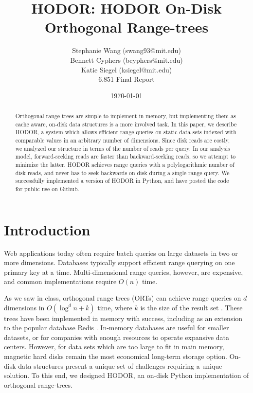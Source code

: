 \documentclass[11pt, oneside]{article}
\title{HODOR: HODOR On-Disk Orthogonal Range-trees}
\author{Stephanie Wang (swang93@mit.edu)\\
Bennett Cyphers (bcyphers@mit.edu)\\
Katie Siegel (ksiegel@mit.edu)\\[2ex]
6.851 Final Report}
\date{\today}
\begin{document}
\maketitle

\vfill

\begin{abstract}

    Orthogonal range trees are simple to implement in memory, but implementing
    them as cache aware, on-disk data structures is a more involved task. In this
    paper, we describe HODOR, a system which allows efficient range queries on
    static data sets indexed with comparable values in an arbitrary number of
    dimensions. Since disk reads are costly, we analyzed our structure in terms
    of the number of reads per query. In our analysis model, forward-seeking
    reads are faster than backward-seeking reads, so we attempt to minimize the
    latter. HODOR achieves range queries with a polylogarithmic number of disk
    reads, and never has to seek backwards on disk during a single range query.
    We successfully implemented a version of HODOR in Python, and have posted
    the code for public use on Github.

\end{abstract}

\clearpage

\section{Introduction}

Web applications today often require batch queries on large datasets in two or
more dimensions. Databases typically support efficient range querying on one
primary key at a time. Multi-dimensional range queries, however, are expensive,
and common implementations require $O(n)$ time. 

As we saw in class, orthogonal range trees (ORTs) can achieve range queries on $d$
dimensions in $O(\log^{d} n + k)$ time, where $k$ is the size of the result set
\cite{lecture}. These trees have been implemented in memory with success,
including as an extension to the popular database Redis \cite{redis}. In-memory
databases are useful for smaller datasets, or for companies with enough
resources to operate expansive data centers. However, for data sets
which are too large to fit in main memory, magnetic hard disks remain the most
economical long-term storage option. On-disk data structures present a unique
set of challenges requiring a unique solution. To this end, we designed HODOR,
an on-disk Python implementation of orthogonal range-trees. 
\end{document}

